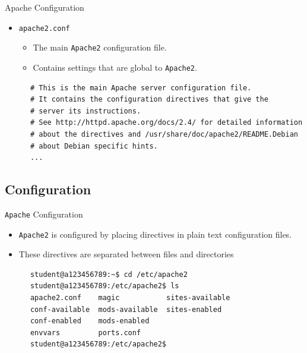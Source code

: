 \documentclass[xcolor=table]{beamer}
\begin{document}
\begin{frame}[fragile]{Apache Configuration}
  \begin{itemize}
    \item \texttt{apache2.conf}
      \begin{itemize}
        \item The main \texttt{Apache2} configuration file. 
        \item Contains settings that are global to \texttt{Apache2}.
      \end{itemize}
  \end{itemize}
  \begin{tcolorbox}
    \lstset{
      basicstyle=\tiny\ttfamily,
    }
    \begin{lstlisting}
      # This is the main Apache server configuration file.  
      # It contains the configuration directives that give the 
      # server its instructions.
      # See http://httpd.apache.org/docs/2.4/ for detailed information 
      # about the directives and /usr/share/doc/apache2/README.Debian 
      # about Debian specific hints.
      ...
    \end{lstlisting}
  \end{tcolorbox}
\end{frame}

\subsection{Configuration}
\begin{frame}[fragile]{\texttt{Apache} Configuration}
  \begin{itemize}
    \item \texttt{Apache2} is configured by placing directives in plain text configuration files. 
    \item These directives are separated between files and directories
  \end{itemize}
  \begin{tcolorbox}
    \lstset{
      basicstyle=\tiny\ttfamily,
    }
    \begin{lstlisting}
      student@a123456789:~$ cd /etc/apache2
      student@a123456789:/etc/apache2$ ls
      apache2.conf    magic           sites-available
      conf-available  mods-available  sites-enabled
      conf-enabled    mods-enabled
      envvars         ports.conf
      student@a123456789:/etc/apache2$
    \end{lstlisting}
  \end{tcolorbox}
\end{frame}
\end{document}
